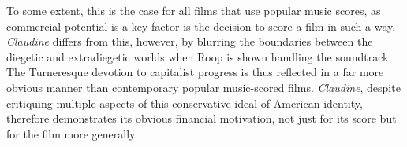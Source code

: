 To some extent, this is the case for all films that use popular music scores, as commercial potential is a key factor is the decision to score a film in such a way.\autocite[Jeff Smith explores this in depth in this study of popular music in film soundtracks. Discussing compiled soundtracks, he notes that, ``derived from a complex mix of music, marketing, and cinema, the compilation score attained its importance as a commercially self-aware alternative to the neo-Romantic orchestral scores of Hollywood's `Golden Age.'" He later adds that ``the compilation score offered a couple of commercial advantages over its predecessors," primarily ``more potential hits to which the film could hitch its wagon."][155-156]{smith_sounds_1998}
\textit{Claudine} differs from this, however, by blurring the boundaries between the diegetic and extradiegetic worlds when Roop is shown handling the soundtrack.
The Turneresque devotion to capitalist progress is thus reflected in a far more obvious manner than contemporary popular music-scored films.
\textit{Claudine}, despite critiquing multiple aspects of this conservative ideal of American identity, therefore demonstrates its obvious financial motivation, not just for its score but for the film more generally.











